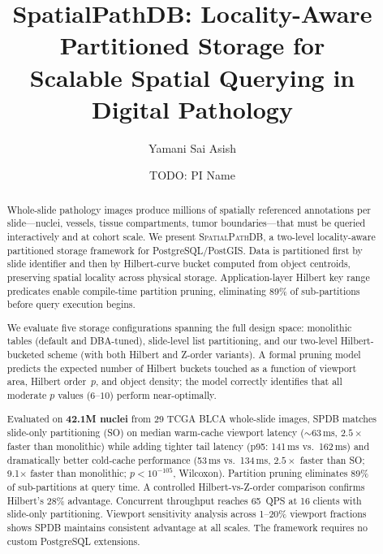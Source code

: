 \documentclass[10pt,twocolumn]{article}
\begin{document}
\title{\textbf{SpatialPathDB: Locality-Aware Partitioned Storage for\\Scalable Spatial Querying in Digital Pathology}}
\author[1]{Yamani Sai Asish}
\author[1]{TODO: PI Name}
\date{}
\maketitle
\begin{abstract}
Whole-slide pathology images produce millions of spatially referenced annotations per slide---nuclei, vessels, tissue compartments, tumor boundaries---that must be queried interactively and at cohort scale.
We present \textsc{SpatialPathDB}, a two-level locality-aware partitioned storage framework for PostgreSQL/PostGIS.
Data is partitioned first by slide identifier and then by Hilbert-curve bucket computed from object centroids, preserving spatial locality across physical storage.
Application-layer Hilbert key range predicates enable compile-time partition pruning, eliminating 89\% of sub-partitions before query execution begins.

We evaluate five storage configurations spanning the full design space: monolithic tables (default and DBA-tuned), slide-level list partitioning, and our two-level Hilbert-bucketed scheme (with both Hilbert and Z-order variants).
A formal pruning model predicts the expected number of Hilbert buckets touched as a function of viewport area, Hilbert order~$p$, and object density; the model correctly identifies that all moderate $p$ values ($6$--$10$) perform near-optimally.

Evaluated on \textbf{42.1M nuclei} from 29 TCGA BLCA whole-slide images, SPDB matches slide-only partitioning (SO) on median warm-cache viewport latency ($\sim$63\,ms, $2.5\times$ faster than monolithic) while adding tighter tail latency (p95: 141\,ms vs.\ 162\,ms) and dramatically better cold-cache performance (53\,ms vs.\ 134\,ms, $2.5\times$ faster than SO; 9.1$\times$ faster than monolithic; $p < 10^{-105}$, Wilcoxon).
Partition pruning eliminates 89\% of sub-partitions at query time.
A controlled Hilbert-vs-Z-order comparison confirms Hilbert's 28\% advantage.
Concurrent throughput reaches 65~QPS at 16 clients with slide-only partitioning.
Viewport sensitivity analysis across 1--20\% viewport fractions shows SPDB maintains consistent advantage at all scales.
The framework requires no custom PostgreSQL extensions.
\end{abstract}
\end{document}
